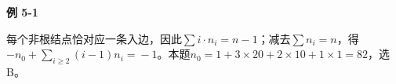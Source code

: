 {\color{ink}\bfseries 例 5-1}\par\vspace{1bp}每个非根结点恰对应一条入边，因此\(\sum i\cdot n_{i}=\allowbreak{}n-1\)；减去\(\sum n_{i}=\allowbreak{}n\)，得\(-n_{0}+\allowbreak{}\sum_{i\ge2}(i-1)n_{i}=\allowbreak{}-1\)。本题\(n_{0}=\allowbreak{}1+\allowbreak{}3\times 20+\allowbreak{}2\times 10+\allowbreak{}1\times 1=\allowbreak{}82\)，选 B。
